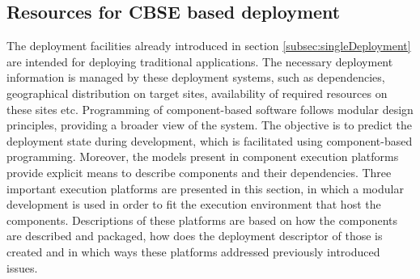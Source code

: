 \subsection{Resources for CBSE based deployment}
The deployment facilities already introduced in section \ref{subsec:singleDeployment} are intended for deploying traditional applications.
The necessary deployment information is managed by these deployment systems, such as dependencies, geographical distribution on target sites, availability of required resources on these sites etc.
Programming of component-based software follows modular design principles, providing a broader view of the system.
The objective is to predict the deployment state during development, which is facilitated using component-based programming.
Moreover, the models present in component execution platforms provide explicit means to describe components and their dependencies.
Three important execution platforms are presented in this section, in which a modular development is used in order to fit the execution environment that host the components.
Descriptions of these platforms are based on how the components are described and packaged, how does the deployment descriptor of those is created and in which ways these platforms addressed previously introduced issues.

